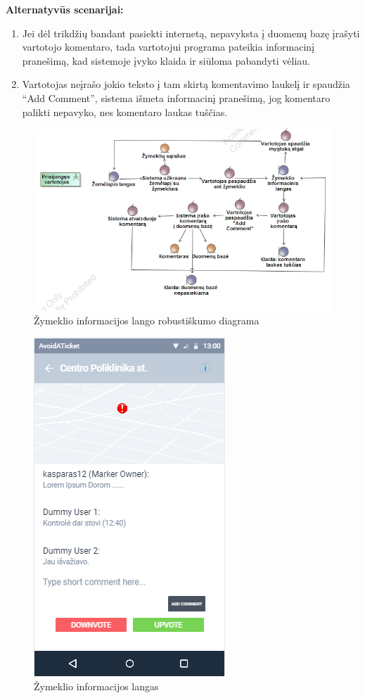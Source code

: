 \documentclass{VUMIFPSkursinis}
\begin{document}
	\textbf{Alternatyvūs scenarijai:}
	\begin{enumerate}[itemsep=-2mm]
		\item Jei dėl trikdžių bandant pasiekti internetą, nepavyksta į duomenų bazę įrašyti vartotojo komentaro, tada vartotojui programa pateikia informacinį pranešimą, kad sistemoje įvyko klaida ir siūloma pabandyti vėliau.
		\item Vartotojas neįrašo jokio teksto į tam skirtą komentavimo laukelį ir spaudžia “Add Comment”, sistema išmeta informacinį pranešimą, jog komentaro palikti nepavyko, nes komentaro laukas tuščias.
	\end{enumerate} 
		\begin{figure}[H]
				\centering
				\includegraphics[scale=0.6]{img/komentaro_apie_zymekli_pridejimas}
				\caption{Žymeklio informacijos lango robustiškumo diagrama}
				\label{img:Žymeklio informacijos langas RD}
			\end{figure}
	\begin{figure}[H]
				\centering
				\includegraphics[scale=0.6]{img/mockup_markerInfoWindow}
				\caption{Žymeklio informacijos langas}
				\label{img:Žymeklio informacijos langas1}
			\end{figure}
\end{document}
